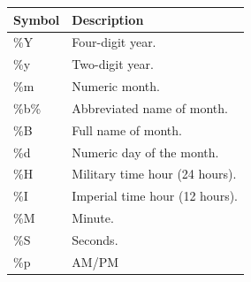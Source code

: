 \documentclass[
  letterpaper,
]{latex/krantz}
\begin{document}
\begin{longtable}[]{@{}ll@{}}
\toprule\noalign{}
Symbol & Description \\
\midrule\noalign{}
\endhead
\bottomrule\noalign{}
\endlastfoot
\%Y & Four-digit year. \\
\%y & Two-digit year. \\
\%m & Numeric month. \\
\%b\% & Abbreviated name of month. \\
\%B & Full name of month. \\
\%d & Numeric day of the month. \\
\%H & Military time hour (24 hours). \\
\%I & Imperial time hour (12 hours). \\
\%M & Minute. \\
\%S & Seconds. \\
\%p & AM/PM \\
\end{longtable}
\end{document}
